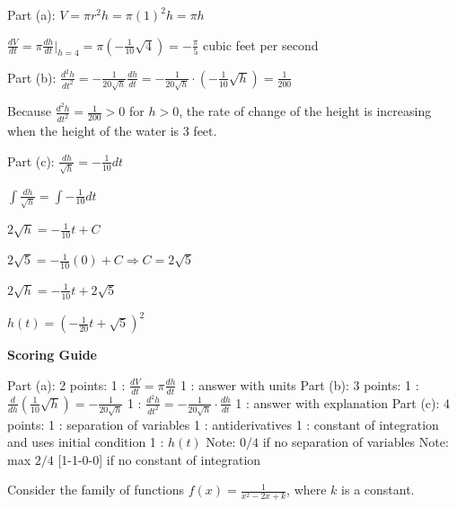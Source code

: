 \documentclass[12pt,addpoints,answers]{exam}
\begin{document}
\begin{questions}
\begin{solution}
Part (a): $V = \pi r^2 h = \pi(1)^2 h = \pi h$ \par $\frac{dV}{dt} = \pi\frac{dh}{dt}\bigg|_{h=4} = \pi\left(-\frac{1}{10}\sqrt{4}\right) = -\frac{\pi}{5}$ cubic feet per second \par Part (b): $\frac{d^2h}{dt^2} = -\frac{1}{20\sqrt{h}}\frac{dh}{dt} = -\frac{1}{20\sqrt{h}} \cdot \left(-\frac{1}{10}\sqrt{h}\right) = \frac{1}{200}$ \par Because $\frac{d^2h}{dt^2} = \frac{1}{200} > 0$ for $h > 0$, the rate of change of the height is increasing when the height of the water is 3 feet. \par Part (c): $\frac{dh}{\sqrt{h}} = -\frac{1}{10}dt$ \par $\int\frac{dh}{\sqrt{h}} = \int -\frac{1}{10}dt$ \par $2\sqrt{h} = -\frac{1}{10}t + C$ \par $2\sqrt{5} = -\frac{1}{10}(0) + C \Rightarrow C = 2\sqrt{5}$ \par $2\sqrt{h} = -\frac{1}{10}t + 2\sqrt{5}$ \par $h(t) = \left(-\frac{1}{20}t + \sqrt{5}\right)^2$
\par\medskip
\textbf{Scoring Guide}\par
Part (a): 2 points: 1 : $\frac{dV}{dt} = \pi\frac{dh}{dt}$ 1 : answer with units Part (b): 3 points: 1 : $\frac{d}{dh}\left(\frac{1}{10}\sqrt{h}\right) = -\frac{1}{20\sqrt{h}}$ 1 : $\frac{d^2h}{dt^2} = -\frac{1}{20\sqrt{h}}\cdot\frac{dh}{dt}$ 1 : answer with explanation Part (c): 4 points: 1 : separation of variables 1 : antiderivatives 1 : constant of integration and uses initial condition 1 : $h(t)$ Note: $0/4$ if no separation of variables Note: max $2/4$ [1-1-0-0] if no constant of integration
\end{solution}

\question
Consider the family of functions $f(x) = \frac{1}{x^2 - 2x + k}$, where $k$ is a constant.
\end{questions}
\end{document}
